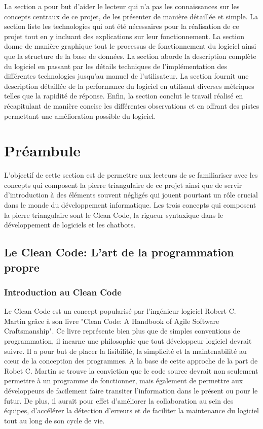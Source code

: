 \documentclass{rapport}
\begin{document}
La section  a pour but d'aider le lecteur qui n'a pas les connaissances sur les concepts centraux de ce projet, de les présenter de manière détaillée et simple. La section  liste les technologies qui ont été nécessaires pour la réalisation de ce projet tout en y incluant des explications sur leur fonctionnement. La section  donne de manière graphique tout le processus de fonctionnement du logiciel ainsi que la structure de la base de données. La section  aborde la description complète du logiciel en passant par les détails techniques de l'implémentation des différentes technologies jusqu'au manuel de l'utilisateur. La section  fournit une description détaillée de la performance du logiciel en utilisant diverses métriques telles que la rapidité de réponse. Enfin, la section  conclut le travail réalisé en récapitulant de manière concise les différentes observations et en offrant des pistes permettant une amélioration possible du logiciel.

\newpage
\section{Préambule}
\label{Préambule}
L'objectif de cette section est de permettre aux lecteurs de se familiariser avec les concepts qui composent la pierre triangulaire de ce projet ainsi que de servir d'introduction à des éléments souvent négligés qui jouent pourtant un rôle crucial dans le monde du développement informatique. Les trois concepts qui composent la pierre triangulaire sont le Clean Code, la rigueur syntaxique dans le développement de logiciels et les chatbots.

\subsection{Le Clean Code: L'art de la programmation propre}
\subsubsection{Introduction au Clean Code}
Le Clean Code est un concept popularisé par l'ingénieur logiciel Robert C. Martin grâce à son livre "Clean Code: A Handbook of Agile Software Craftsmanship". Ce livre représente bien plus que de simples conventions de programmation, il incarne une philosophie que tout développeur logiciel devrait suivre. Il a pour but de placer la lisibilité, la simplicité et la maintenabilité au cœur de la conception des programmes. A la base de cette approche de la part de Robet C. Martin se trouve la conviction que le code source devrait non seulement permettre à un programme de fonctionner, mais également de permettre aux développeurs de facilement faire transiter l'information dans le présent ou pour le futur. De plus, il aurait pour effet d'améliorer la collaboration au sein des équipes, d'accélérer la détection d'erreurs et de faciliter la maintenance du logiciel tout au long de son cycle de vie.
\end{document}
